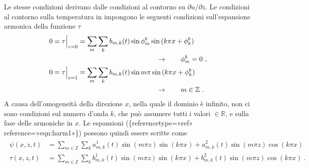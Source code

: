 \documentclass[letterpaper,10pt,italian]{jupyterBook}
\begin{document}
\sphinxAtStartPar
Le stesse condizioni derivano dalle condizioni al
contorno su \(\partial u/\partial z\). Le condizioni al contorno sulla
temperatura in impongono le seguenti condizioni sull’espansione armonica
della funzione \(\tau\)
\begin{equation*}
\begin{split}\begin{aligned}
      0 = \tau \Big|_{z=0} & = \sum_m \sum_k b_{m,k}(t) \sin{ \phi^b_m }\sin{(k\pi x + \phi^b_k)} \\
      & \hspace{4.0cm} \rightarrow \qquad \phi^b_m = 0 \ ,\\
      0 = \tau \Big|_{z=1} & = \sum_m \sum_k b_{m,k}(t) \sin{ m \pi }\sin{(k\pi x + \phi^b_k)} \\
      & \hspace{4.0cm} \rightarrow \qquad m \in \mathbb{Z} \ .
\end{aligned}\end{split}
\end{equation*}
\sphinxAtStartPar
A causa dell’omogeneità della direzione \(x\), nella
quale il dominio è infinito, non ci sono condizioni sul numero d’onda
\(k\), che può assumere tutti i valori \(\in \mathbb{R}\), e sulla fase
delle armoniche in \(x\). Le espansioni
(\{reference\sphinxhyphen{}type=»ref»
reference=»eqn:harm\sphinxhyphen{}1»\}) possono quindi essere scritte come
\begin{equation*}
\begin{split}\label{eqn:harm-2}
\begin{aligned}
    \psi(x,z,t) & = \sum_{m \in \mathbb{Z}} \sum_k a^1_{m,k}(t) \sin{(m\pi z)} \sin{(k\pi x )} +  a^2_{m,k}(t) \sin{(m\pi z)} \cos{(k \pi x)} \\
    \tau(x,z,t) & = \sum_{m \in \mathbb{Z}} \sum_k b^1_{m,k}(t) \sin{(m\pi z)} \sin{(k\pi x )} + b^2_{m,k}(t) \sin{(m\pi z)} \cos{(k \pi x)}  \ .
\end{aligned}\end{split}
\end{equation*}
\end{document}

